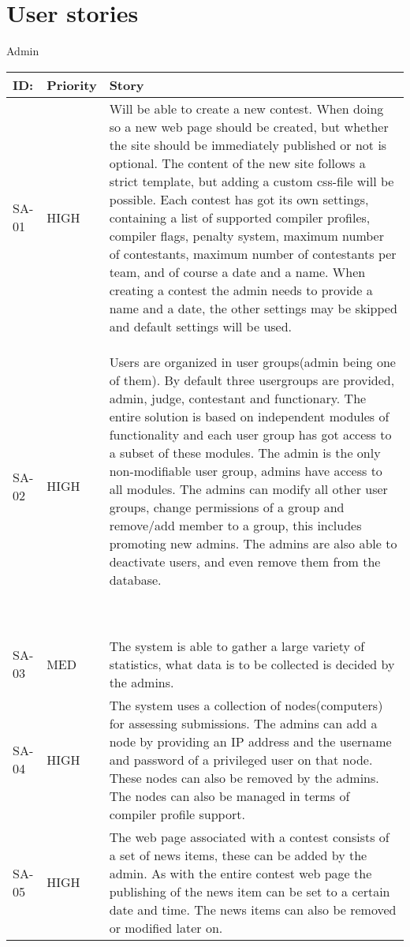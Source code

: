 \chapter{User stories}

Admin

\begin{flushleft}
\tablehead{}
\begin{supertabular}{|p{0.1\textwidth}|p{0.1\textwidth}|p{0.8\textwidth}|}
\hline
ID: &
Priority &
Story\\\hline
SA{}-01 &
HIGH &
Will be able to create a new contest. When doing so a new web page
should be created, but whether the site should be immediately published
or not is optional. The content of the new site follows a strict
template, but adding a custom css{}-file will be possible. Each contest
has got its own settings, containing a list of supported compiler
profiles, compiler flags, penalty system, maximum number of
contestants, maximum number of contestants per team, and of course a
date and a name. When creating a contest the admin needs to provide a
name and a date, the other settings may be skipped and default settings
will be used.\\\hline
SA{}-02 &
HIGH &
Users are organized in user groups(admin being one of them). By default
three usergroups are provided, admin, judge, contestant and
functionary. The entire solution is based on independent modules of
functionality and each user group has got access to a subset of these
modules. The admin is the only non{}-modifiable user group, admins have
access to all modules. The admins can modify all other user groups,
change permissions of a group and remove/add member to a group, this
includes promoting new admins. The admins are also able to deactivate
users, and even remove them from the database.

~
\\\hline
SA{}-03 &
MED &
The system is able to gather a large variety of statistics, what data is
to be collected is decided by the admins.\\\hline
SA{}-04 &
HIGH &
The system uses a collection of nodes(computers) for assessing
submissions. The admins can add a node by providing an IP address and
the username and password of a privileged user on that node. These
nodes can also be removed by the admins. The nodes can also be managed
in terms of compiler profile support.\\\hline
SA{}-05 &
HIGH &
The web page associated with a contest consists of a set of news items,
these can be added by the admin. As with the entire contest web page
the publishing of the news item can be set to a certain date and time.
The news items can also be removed or modified later on.\\\hline
\end{supertabular}
\end{flushleft}

